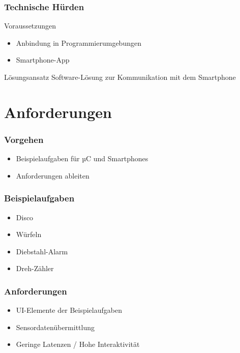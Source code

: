 \documentclass{beamer}
\begin{document}
\begin{frame}
    \frametitle{Technische Hürden}
    \begin{alertblock}{Voraussetzungen}
        \begin{itemize}
            \item Anbindung in Programmierumgebungen
            \item Smartphone-App
        \end{itemize}
    \end{alertblock}
    \begin{block}{Lösungsansatz}
        Software-Lösung zur Kommunikation mit dem Smartphone
    \end{block}
\end{frame}

\section{Anforderungen}
\begin{frame}
    \frametitle{Vorgehen}
    \begin{itemize}
        \item Beispielaufgaben für µC und Smartphones
        \item Anforderungen ableiten
    \end{itemize}
\end{frame}

\begin{frame}
    \frametitle{Beispielaufgaben}
    \begin{itemize}
        \item Disco
        \item Würfeln
        \item Diebstahl-Alarm
        \item Dreh-Zähler
    \end{itemize}
\end{frame}

\begin{frame}
    \frametitle{Anforderungen}
    \begin{itemize}
        \item UI-Elemente der Beispielaufgaben
        \item Sensordatenübermittlung
        \item Geringe Latenzen / Hohe Interaktivität
    \end{itemize}
\end{frame}
\end{document}
